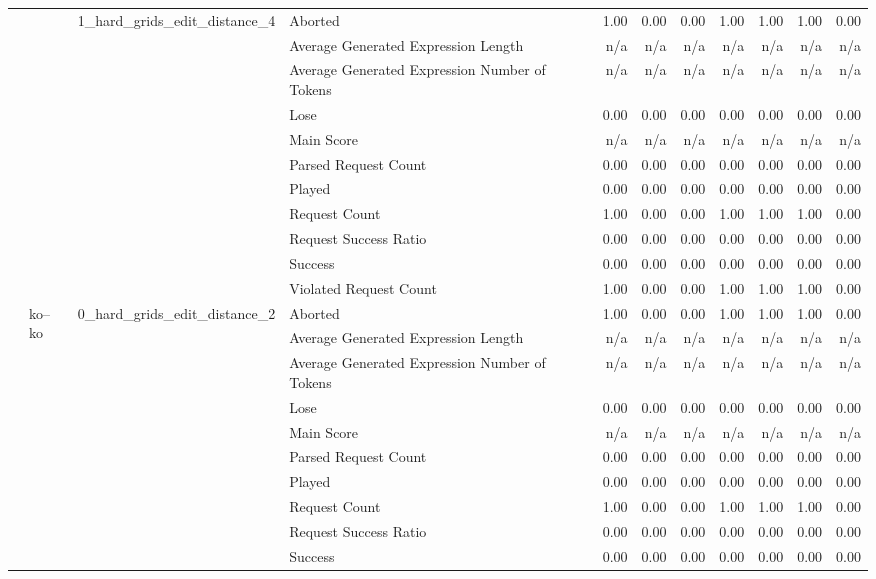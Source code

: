 \begin{tabular}{llllrrrrrrr}
\cline{3-11}
 &  & \multirow[t]{11}{*}{1_hard_grids_edit_distance_4} & Aborted & 1.00 & 0.00 & 0.00 & 1.00 & 1.00 & 1.00 & 0.00 \\
 &  &  & Average Generated Expression Length & n/a & n/a & n/a & n/a & n/a & n/a & n/a \\
 &  &  & Average Generated Expression Number of Tokens & n/a & n/a & n/a & n/a & n/a & n/a & n/a \\
 &  &  & Lose & 0.00 & 0.00 & 0.00 & 0.00 & 0.00 & 0.00 & 0.00 \\
 &  &  & Main Score & n/a & n/a & n/a & n/a & n/a & n/a & n/a \\
 &  &  & Parsed Request Count & 0.00 & 0.00 & 0.00 & 0.00 & 0.00 & 0.00 & 0.00 \\
 &  &  & Played & 0.00 & 0.00 & 0.00 & 0.00 & 0.00 & 0.00 & 0.00 \\
 &  &  & Request Count & 1.00 & 0.00 & 0.00 & 1.00 & 1.00 & 1.00 & 0.00 \\
 &  &  & Request Success Ratio & 0.00 & 0.00 & 0.00 & 0.00 & 0.00 & 0.00 & 0.00 \\
 &  &  & Success & 0.00 & 0.00 & 0.00 & 0.00 & 0.00 & 0.00 & 0.00 \\
 &  &  & Violated Request Count & 1.00 & 0.00 & 0.00 & 1.00 & 1.00 & 1.00 & 0.00 \\
\cline{2-11} \cline{3-11}
 & \multirow[t]{22}{*}{ko--ko} & \multirow[t]{11}{*}{0_hard_grids_edit_distance_2} & Aborted & 1.00 & 0.00 & 0.00 & 1.00 & 1.00 & 1.00 & 0.00 \\
 &  &  & Average Generated Expression Length & n/a & n/a & n/a & n/a & n/a & n/a & n/a \\
 &  &  & Average Generated Expression Number of Tokens & n/a & n/a & n/a & n/a & n/a & n/a & n/a \\
 &  &  & Lose & 0.00 & 0.00 & 0.00 & 0.00 & 0.00 & 0.00 & 0.00 \\
 &  &  & Main Score & n/a & n/a & n/a & n/a & n/a & n/a & n/a \\
 &  &  & Parsed Request Count & 0.00 & 0.00 & 0.00 & 0.00 & 0.00 & 0.00 & 0.00 \\
 &  &  & Played & 0.00 & 0.00 & 0.00 & 0.00 & 0.00 & 0.00 & 0.00 \\
 &  &  & Request Count & 1.00 & 0.00 & 0.00 & 1.00 & 1.00 & 1.00 & 0.00 \\
 &  &  & Request Success Ratio & 0.00 & 0.00 & 0.00 & 0.00 & 0.00 & 0.00 & 0.00 \\
 &  &  & Success & 0.00 & 0.00 & 0.00 & 0.00 & 0.00 & 0.00 & 0.00 \\

\end{tabular}
